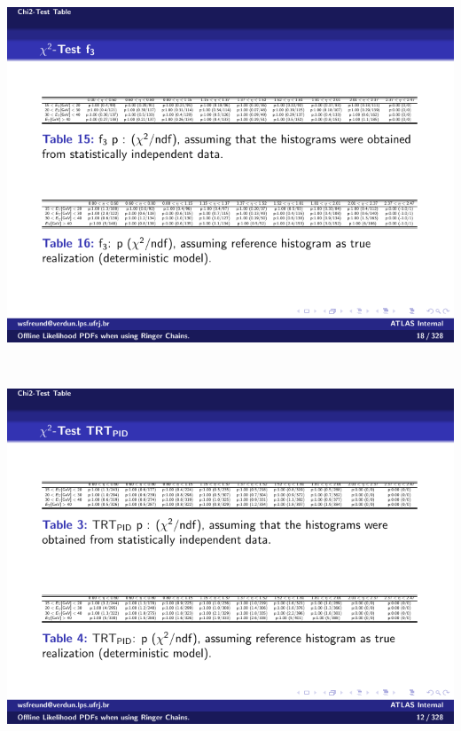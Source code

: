 \begin{table}[p]
\begin{subtable}{\textwidth}
\includegraphics[width=\textwidth]{appendices/figures/gof/f3_chi2_table.pdf}
\end{subtable} \\
\begin{subtable}{\textwidth}
\caption{\TRTPID{}\label{tab:gof_chi2_p_values_trt}}
\includegraphics[width=\textwidth]{appendices/figures/gof/TRT_PID_chi2_table.pdf}
\end{subtable} \\
\begin{subtable}{\textwidth}
\caption{\deltaeta{}\label{tab:gof_chi2_p_values_eta}}

\end{subtable}
\end{table}
